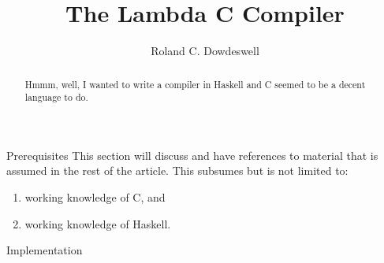 \documentclass[12pt]{article}
\title{The Lambda C Compiler}
\author{Roland C. Dowdeswell}
\theoremstyle{plain}
\theoremstyle{definition}
\begin{document}
\maketitle
\begin{abstract}

Hmmm, well, I wanted to write a compiler in Haskell and C
seemed to be a decent language to do.

\end{abstract}

\clearpage
\tableofcontents
\clearpage

\begin{section}{Prerequisites}
This section will discuss and have references to material that
is assumed in the rest of the article.  This subsumes but is
not limited to:
\begin{enumerate}
\item		working knowledge of C, and
\item		working knowledge of Haskell.
\end{enumerate}
\end{section}

\clearpage
\begin{section}{Implementation}

\end{section}

\end{document}
